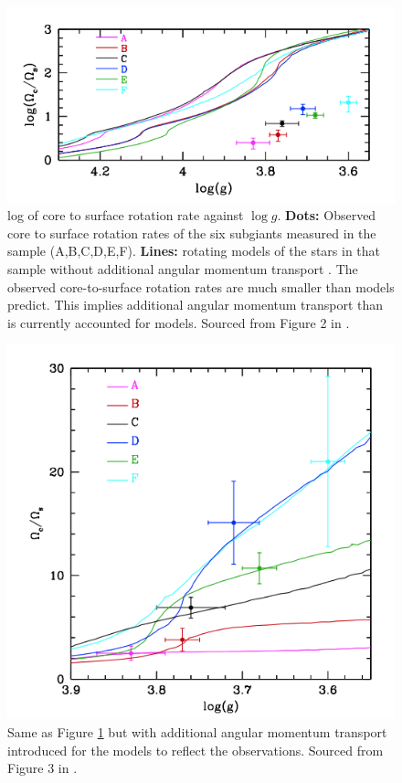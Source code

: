 \begin{figure}[h]
    \includegraphics[width=\textwidth]{Figures/intro_figures/deheuvels_disparity_without.png}
    \caption{log of core to surface rotation rate against $\log{g}$. 
    \textbf{Dots:} Observed core to surface rotation rates of the six subgiants measured in the \citet{deheuvels_seismic_2014} sample (A,B,C,D,E,F).
    \textbf{Lines:} rotating models of the stars in that sample without additional angular momentum transport \citep{eggenberger_asteroseismology_2019}.
    The observed core-to-surface rotation rates are much smaller than models predict. This implies additional angular momentum transport than is currently accounted for models.
    Sourced from Figure 2 in \citep{eggenberger_asteroseismology_2019}.}
    \label{fig:deh_without}
\end{figure}

\begin{figure}[h]
    \includegraphics[width=\textwidth]{Figures/intro_figures/deheuvels_disparity_with.png}
    \caption{Same as Figure \ref{fig:deh_without} but with additional angular momentum transport introduced for the models to reflect the observations.
    Sourced from Figure 3 in \citep{eggenberger_asteroseismology_2019}.}
    \label{fig:deh_with}
\end{figure}


